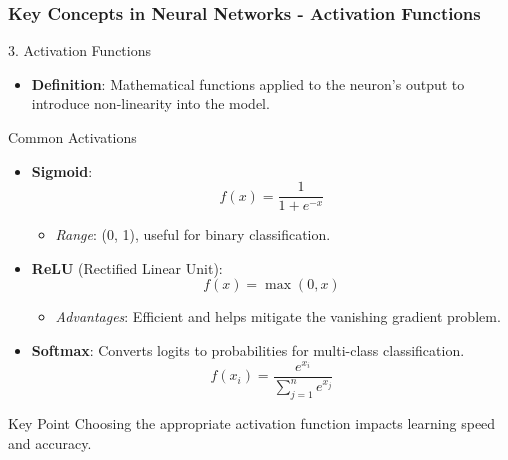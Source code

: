 \documentclass[aspectratio=169]{beamer}
\begin{document}
\begin{frame}[fragile]
    \frametitle{Key Concepts in Neural Networks - Activation Functions}
    \begin{block}{3. Activation Functions}
        \begin{itemize}
            \item \textbf{Definition}: Mathematical functions applied to the neuron's output to introduce non-linearity into the model.
        \end{itemize}
    \end{block}
    \begin{block}{Common Activations}
        \begin{itemize}
            \item \textbf{Sigmoid}:
                \begin{equation}
                    f(x) = \frac{1}{1 + e^{-x}}
                \end{equation}
                \begin{itemize}
                    \item \textit{Range}: (0, 1), useful for binary classification.
                \end{itemize}

            \item \textbf{ReLU} (Rectified Linear Unit):
                \begin{equation}
                    f(x) = \max(0, x)
                \end{equation}
                \begin{itemize}
                    \item \textit{Advantages}: Efficient and helps mitigate the vanishing gradient problem.
                \end{itemize}

            \item \textbf{Softmax}:
                Converts logits to probabilities for multi-class classification.
                \begin{equation}
                    f(x_i) = \frac{e^{x_i}}{\sum_{j=1}^{n} e^{x_j}}
                \end{equation}
        \end{itemize}
    \end{block}
    \begin{block}{Key Point}
        Choosing the appropriate activation function impacts learning speed and accuracy.
    \end{block}
\end{frame}
\end{document}
